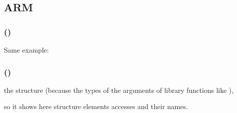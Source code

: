 ﻿\subsection{ARM}

\subsubsection{\OptimizingKeilVI (\ThumbMode)}

Same example:



\subsubsection{\OptimizingXcodeIV (\ThumbTwoMode)}

\IDA {} the  structure 
(because \IDA {} the types of the arguments of library functions like ), 

so it shows here structure elements accesses and their names.


